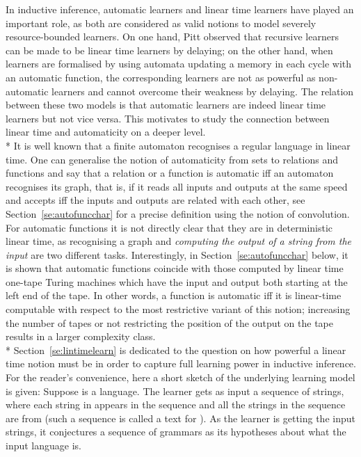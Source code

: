 \documentclass{LMCS}
\theoremstyle{plain}\newtheorem{athm}[thm]{Theorem}
\theoremstyle{plain}\newtheorem{aprop}[thm]{Proposition}
\theoremstyle{plain}\newtheorem{aprob}[thm]{Open Problem}
\theoremstyle{plain}\newtheorem{acor}[thm]{Corollary}
\theoremstyle{plain}\newtheorem{alem}[thm]{Lemma}
\theoremstyle{definition}\newtheorem{adefn}[thm]{Definition}
\theoremstyle{definition}\newtheorem{arem}[thm]{Remark}
\theoremstyle{plain}\newtheorem{aexmp}[thm]{Example}
\theoremstyle{plain}\newtheorem{aclm}[thm]{Claim}
\def\sp{\\*\indent}
\begin{document}
\noindent
In inductive inference, automatic learners and linear time learners have
played an important role, as both are considered as valid notions to model
severely resource-bounded learners.
On one hand, Pitt \cite{Pi89} observed that recursive learners can be made
to be linear time learners by delaying; on the other hand, when learners
are formalised by using automata updating a memory in each cycle with
an automatic function, the corresponding learners are not as powerful
as non-automatic learners \cite{JLS09} and cannot overcome their weakness
by delaying. The relation between these two models is that automatic learners
are indeed linear time learners \cite{CJLOSS11} but not vice versa.
This motivates to study the connection between linear time and automaticity
on a deeper level.
\sp
It is well known that a finite automaton recognises a regular language
in linear time. One can generalise the notion of automaticity from
sets to relations and functions \cite{Bl99,BG00,Ho76,Ho83,KN95,Ru08} 
and say that
a relation or a function is automatic iff an automaton recognises its graph,
that is, if it reads all inputs and outputs at the same speed and accepts
iff the inputs and outputs are related with each other, see
Section~\ref{se:autofuncchar} for a precise definition using the
notion of convolution. For automatic functions it is not directly
clear that they are in deterministic linear time, as recognising a graph
and {\em computing the output of a string from the input\/}
are two different tasks. Interestingly,
in Section~\ref{se:autofuncchar} below, it is shown that automatic functions
coincide with those computed by linear time one-tape Turing machines which
have the input and output both starting at the left end of the tape.
In other words, a function is automatic iff it is linear-time computable
with respect to the most restrictive variant of this notion;
increasing the number of tapes or not restricting the position of the
output on the tape results in a larger complexity class.
\sp
Section~\ref{se:lintimelearn} is dedicated to the question on how
powerful a linear time notion must be in order to capture full
learning power in inductive inference. For the reader's convenience,
here a short sketch of the underlying learning model is given:
Suppose  is a language.
The learner gets as input a sequence  of strings,
where each string in  appears in the sequence and all the strings
in the sequence are from  (such a sequence is called a text for ). 
As the learner is getting the input
strings, it conjectures a sequence of grammars 
as its hypotheses about what the input language is.
\end{document}
